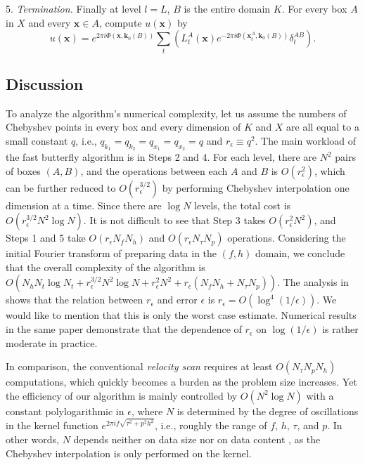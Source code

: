 5.  {\it Termination.} Finally at level $l=L$, $B$ is the entire domain $K$. For every box $A$ in $X$ and every $\mathbf{x}\in A$, compute $u(\mathbf{x})$ by
\begin{equation} \label{Delta5}
u(\mathbf{x})=e^{2\pi i
  \Phi(\mathbf{x},\mathbf{k}_0(B))}\sum_t \left( L_t^A(\mathbf{x}) e^{-2\pi i
  \Phi(\mathbf{x}_t^A,\mathbf{k}_0(B))}
  \delta_t^{AB}\right).
\end{equation}





\subsection{Discussion}

To analyze the algorithm's numerical complexity, let us assume the numbers of Chebyshev points in every box and every dimension of $K$ and $X$ are all equal to a small constant $q$, i.e., $q_{k_1}=q_{k_2}=q_{x_1}=q_{x_2}=q$ and $r_{\epsilon}\equiv q^2$. The main workload of the fast butterfly algorithm is in Steps 2 and 4. For each level, there are $N^2$ pairs of boxes $(A,B)$, and the operations between each $A$ and $B$ is $O(r_{\epsilon}^2)$, which can be further reduced to $O(r_{\epsilon}^{3/2})$ by performing Chebyshev interpolation one dimension at a time. Since there are $\log N$ levels, the total cost is $O(r_{\epsilon}^{3/2} N^2\log N)$. It is not difficult to see that Step 3 takes $O(r_{\epsilon}^2 N^2)$, and Steps 1 and 5 take $O(r_{\epsilon}N_fN_h)$ and $O(r_{\epsilon}N_{\tau}N_p)$ operations. Considering the initial Fourier transform of preparing data in the $(f,h)$ domain, we conclude that the overall complexity of the algorithm is $O(N_h N_t \log N_t+ r_{\epsilon}^{3/2}N^2\log N +r_{\epsilon}^2 N^2+ r_{\epsilon}(N_fN_h+N_{\tau}N_p))$. The analysis in \cite{CDY09} shows that the relation between $r_{\epsilon}$ and error $\epsilon$ is $r_{\epsilon}=O(\log ^4(1/\epsilon))$. We would like to mention that this is only the worst case estimate. Numerical results in the same paper demonstrate that the dependence of $r_{\epsilon}$ on $\log(1/\epsilon)$ is rather moderate in practice.

In comparison, the conventional {\it velocity scan} requires at least $O(N_{\tau}N_pN_h)$ computations, which quickly becomes a burden as the problem size increases. Yet the efficiency of our algorithm is mainly controlled by $O(N^2 \log N)$ with a constant polylogarithmic in $\epsilon$, where $N$ is determined by the degree of oscillations in the kernel function $e^{ 2\pi i f\sqrt{\tau^2+p^2h^2} }$, i.e., roughly the range of $f$, $h$, $\tau$, and $p$. In other words, $N$ depends neither on data size nor on data content , as the Chebyshev interpolation is only performed on the kernel.

